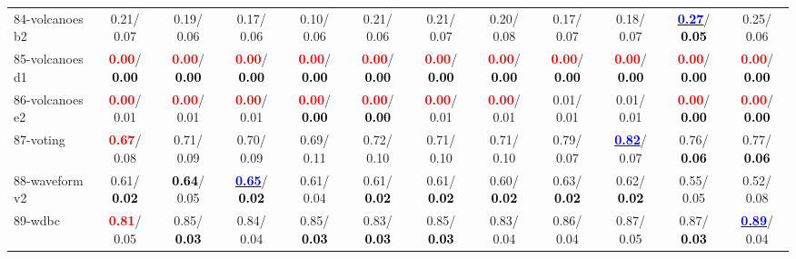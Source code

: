 \begin{table}[h]
\begin{center}
{\begin{tabular}{lc|c|c|c|c|c|c|c|c|c|c}
84-volcanoes b2 &   0.21/  0.07 &   0.19/  0.06 &   0.17/  0.06 &   0.10/  0.06 &   0.21/  0.06 &   0.21/  0.07 &   0.20/  0.08 &   0.17/  0.07 &   0.18/  0.07 & \underline{\textcolor{blue}{\textbf{  0.27}}}/\textcolor{black}{\textbf{  0.05}} &   0.25/  0.06 \\
85-volcanoes d1 & \textcolor{red}{\textbf{  0.00}}/\textcolor{black}{\textbf{  0.00}} & \textcolor{red}{\textbf{  0.00}}/\textcolor{black}{\textbf{  0.00}} & \textcolor{red}{\textbf{  0.00}}/\textcolor{black}{\textbf{  0.00}} & \textcolor{red}{\textbf{  0.00}}/\textcolor{black}{\textbf{  0.00}} & \textcolor{red}{\textbf{  0.00}}/\textcolor{black}{\textbf{  0.00}} & \textcolor{red}{\textbf{  0.00}}/\textcolor{black}{\textbf{  0.00}} & \textcolor{red}{\textbf{  0.00}}/\textcolor{black}{\textbf{  0.00}} & \textcolor{red}{\textbf{  0.00}}/\textcolor{black}{\textbf{  0.00}} & \textcolor{red}{\textbf{  0.00}}/\textcolor{black}{\textbf{  0.00}} & \textcolor{red}{\textbf{  0.00}}/\textcolor{black}{\textbf{  0.00}} & \textcolor{red}{\textbf{  0.00}}/\textcolor{black}{\textbf{  0.00}} \\ \hline
86-volcanoes e2 & \textcolor{red}{\textbf{  0.00}}/  0.01 & \textcolor{red}{\textbf{  0.00}}/  0.01 & \textcolor{red}{\textbf{  0.00}}/  0.01 & \textcolor{red}{\textbf{  0.00}}/\textcolor{black}{\textbf{  0.00}} & \textcolor{red}{\textbf{  0.00}}/\textcolor{black}{\textbf{  0.00}} & \textcolor{red}{\textbf{  0.00}}/  0.01 & \textcolor{red}{\textbf{  0.00}}/  0.01 &   0.01/  0.01 &   0.01/  0.01 & \textcolor{red}{\textbf{  0.00}}/\textcolor{black}{\textbf{  0.00}} & \textcolor{red}{\textbf{  0.00}}/\textcolor{black}{\textbf{  0.00}} \\
87-voting & \textcolor{red}{\textbf{  0.67}}/  0.08 &   0.71/  0.09 &   0.70/  0.09 &   0.69/  0.11 &   0.72/  0.10 &   0.71/  0.10 &   0.71/  0.10 &   0.79/  0.07 & \underline{\textcolor{blue}{\textbf{  0.82}}}/  0.07 &   0.76/\textcolor{black}{\textbf{  0.06}} &   0.77/\textcolor{black}{\textbf{  0.06}} \\
88-waveform v2 &   0.61/\textcolor{black}{\textbf{  0.02}} & \textcolor{black}{\textbf{  0.64}}/  0.05 & \underline{\textcolor{blue}{\textbf{  0.65}}}/\textcolor{black}{\textbf{  0.02}} &   0.61/  0.04 &   0.61/\textcolor{black}{\textbf{  0.02}} &   0.61/\textcolor{black}{\textbf{  0.02}} &   0.60/\textcolor{black}{\textbf{  0.02}} &   0.63/\textcolor{black}{\textbf{  0.02}} &   0.62/\textcolor{black}{\textbf{  0.02}} &   0.55/  0.05 &   0.52/  0.08 \\
89-wdbc & \textcolor{red}{\textbf{  0.81}}/  0.05 &   0.85/\textcolor{black}{\textbf{  0.03}} &   0.84/  0.04 &   0.85/\textcolor{black}{\textbf{  0.03}} &   0.83/\textcolor{black}{\textbf{  0.03}} &   0.85/\textcolor{black}{\textbf{  0.03}} &   0.83/  0.04 &   0.86/  0.04 &   0.87/  0.05 &   0.87/\textcolor{black}{\textbf{  0.03}} & \underline{\textcolor{blue}{\textbf{  0.89}}}/  0.04 \\

\end{tabular}}
\end{center}
\end{table}
